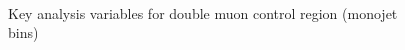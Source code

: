\begin{figure}
\begin{center}
         \\
        \caption{Key analysis variables for double muon control region (monojet bins)}
        \label{fig:distribution_doublemu_mono}
    \end{center}
\end{figure}


